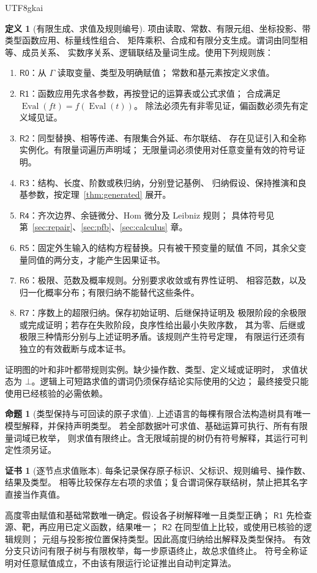 \documentclass[12pt]{report}
\makeatletter
\theoremstyle{definition}
\newtheorem{definition}{定义}[chapter]
\newtheorem{proposition}{命题}[chapter]
\newtheorem{Certificate}{证书}[chapter]
\renewenvironment{proof}[1][\proofname]{\par
  \pushQED{\qed}\normalfont
  \topsep6\p@\@plus6\p@\relax
  \trivlist
  \item[\hskip\labelsep\normalfont #1\@addpunct{.}]\ignorespaces
}{
  \popQED\endtrivlist\@endpefalse
}
\makeatother
\begin{document}
\begin{CJK*}{UTF8}{gkai}
\begin{definition}[有限生成、求值及规则编号]
\label{def:rules}
项由读取、常数、有限元组、坐标投影、带类型函数应用、标量线性组合、
矩阵乘积、合成和有限分支生成。谓词由同型相等、成员关系、
实数序关系、逻辑联结及量词生成。使用下列规则族：
\begin{enumerate}
\item \(\mathsf{R0}\)：从 \(\Gamma\) 读取变量、类型及明确赋值；
常数和基元素按定义求值。
\item \(\mathsf{R1}\)：函数应用先求各参数，再按登记的运算表或公式求值；
合成满足 \(\operatorname{Eval}(ft)=f(\operatorname{Eval}(t))\)。
除法必须先有非零见证，偏函数必须先有定义域见证。
\item \(\mathsf{R2}\)：同型替换、相等传递、有限集合外延、布尔联结、
存在见证引入和全称实例化。有限量词遍历声明域；
无限量词必须使用对任意变量有效的符号证明。
\item \(\mathsf{R3}\)：结构、长度、阶数或秩归纳，分别登记基例、
归纳假设、保持推演和良基参数，按定理~\ref{thm:generated} 展开。
\item \(\mathsf{R4}\)：齐次边界、余链微分、Hom 微分及 Leibniz 规则；
具体符号见第~\ref{sec:repair}、\ref{sec:pfb}、\ref{sec:calculus} 章。
\item \(\mathsf{R5}\)：固定外生输入的结构方程替换。只有被干预变量的赋值
不同，其余父变量同值的两分支，才能产生因果证书。
\item \(\mathsf{R6}\)：极限、范数及概率规则。分别要求收敛或有界性证明、
相容范数，以及归一化概率分布；有限归纳不能替代这些条件。
\item \(\mathsf{R7}\)：序数上的超限归纳。保存初始证明、后继保持证明及
极限阶段的余极限或完成证明；若存在失败阶段，良序性给出最小失败序数，
其为零、后继或极限三种情形分别与上述证明矛盾。该规则产生符号定理，
有限运行还须有独立的有效截断与成本证书。
\end{enumerate}
证明图的叶和非叶都带规则实例。缺少操作数、类型、定义域或证明时，
求值状态为 \(\bot\)。逻辑上可短路求值的谓词仍须保存结论实际使用的父边；
最终接受只能使用已经核验的必需依赖。
\end{definition}

\begin{proposition}[类型保持与可回读的原子求值]
\label{prop:atom-eval}
上述语言的每棵有限合法构造树具有唯一模型解释，并保持声明类型。
若全部数据叶可求值、基础运算可执行、所有有限量词域已枚举，
则求值有限终止。含无限域前提的树仍有符号解释，其运行可判定性须另证。
\end{proposition}
\begin{Certificate}[逐节点求值账本]
每条记录保存原子标识、父标识、规则编号、操作数、结果及类型。
相等比较保存左右项的求值；复合谓词保存联结树，禁止把其名字直接当作真值。
\end{Certificate}
\begin{proof}
高度零由赋值和基础常数唯一确定。假设各子树解释唯一且类型正确；
\(\mathsf{R1}\) 先检查源、靶，再应用已定义函数，结果唯一；
\(\mathsf{R2}\) 在同型值上比较，或使用已核验的逻辑规则；
元组与投影按位置保持类型。因此高度归纳给出解释及类型保持。
有效分支只访问有限子树与有限枚举，每一步原语终止，故总求值终止。
符号全称证明对任意赋值成立，不由该有限运行论证推出自动判定算法。
\end{proof}


\end{CJK*}
\end{document}
